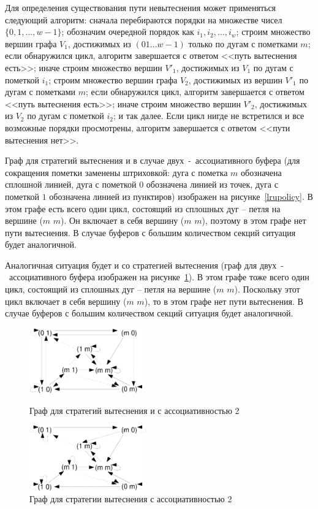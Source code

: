 Для определения существования пути невытеснения может применяться
следующий алгоритм: сначала перебираются порядки на множестве чисел
$\{0, 1, ..., w-1\}$; обозначим очередной порядок как $i_1, i_2,
..., i_w$; строим множество вершин графа $V_1$, достижимых из $(0 1
... w-1)$ только по дугам с пометками $m$; если обнаружился цикл,
алгоритм завершается с ответом <<путь вытеснения есть>>; иначе
строим множество вершин $V'_1$, достижимых из $V_1$ по дугам с
пометкой $i_1$; строим множество вершин графа $V_2$, достижимых из
вершин $V'_1$ по дугам с пометками $m$; если обнаружился цикл,
алгоритм завершается с ответом <<путь вытеснения есть>>; иначе
строим множество вершин $V'_2$, достижимых из $V_2$ по дугам с
пометкой $i_2$; и так далее. Если цикл нигде не встретился и все
возможные порядки просмотрены, алгоритм завершается с ответом <<пути
вытеснения нет>>.

Граф для стратегий вытеснения \LRU и \PseudoLRU в случае
двух~-~ассоциативного буфера (для сокращения пометки заменены
штриховкой: дуга с пометка $m$ обозначена сплошной линией, дуга с
пометкой $0$ обозначена линией из точек, дуга с пометкой $1$
обозначена линией из пунктиров) изображен на
рисунке~\ref{lrupolicy}. В этом графе есть всего один цикл,
состоящий из сплошных дуг -- петля на вершине ($m$ $m$). Он включает
в себя вершину ($m$ $m$), поэтому в этом графе нет пути вытеснения.
В случае буферов с большим количеством секций ситуация будет
аналогичной.

Аналогичная ситуация будет и со стратегией вытеснения \FIFO (граф
для двух~-~ассоциативного буфера изображен на
рисунке~\ref{fifopolicy}). В этом графе тоже всего один цикл,
состоящий из сплошных дуг -- петля на вершине ($m$ $m$). Поскольку
этот цикл включает в себя вершину ($m$ $m$), то в этом графе нет
пути вытеснения. В случае буферов с большим количеством секций
ситуация будет аналогичной.

\begin{figure}[h]
\parbox{0.5\textwidth}{ \centering
  \includegraphics[width=0.45\textwidth]{2.theor/lrupolicy}
  \caption{Граф для стратегий вытеснения \LRU и \PseudoLRU с ассоциативностью 2}
  \label{lrupolicy}
} \vline
\parbox{0.5\textwidth}{ \centering
  \includegraphics[width=0.45\textwidth]{2.theor/fifopolicy}
  \caption{Граф для стратегии вытеснения \FIFO с ассоциативностью 2}
  \label{fifopolicy}
}
\end{figure}


